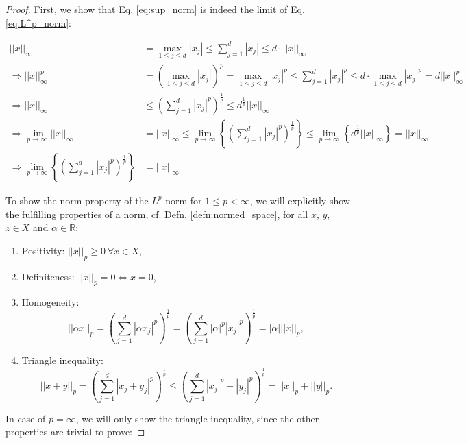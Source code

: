 \documentclass[12pt, a4paper]{article}
\numberwithin{equation}{section}
\theoremstyle{definition}
\theoremstyle{definition}
\newcommand{\norm}[2]{\left\vert\left\vert #1 \right\vert\right\vert_{#2}}
\newcommand{\abs}[1]{\left\vert #1 \right\vert}
\begin{document}
	\begin{proof}
		First, we show that Eq. \eqref{eq:sup_norm} is indeed the limit of Eq. \eqref{eq:L^p_norm}:
	
		\begin{align}
			\norm{x}{\infty} &= \max_{1\leq j\leq d}{\abs{x_j}} \leq \sum_{j=1}^{d}\abs{x_j} \leq d \cdot \norm{x}{\infty}
			\\ \Rightarrow \norm{x}{\infty}^p &= \left(\max_{1\leq j\leq d}{\abs{x_j}}\right)^p = \max_{1\leq j\leq d}{\abs{x_j}^p} \leq \sum_{j=1}^{d}\abs{x_j}^p \leq d \cdot \max_{1\leq j\leq d}{\abs{x_j}^p} = d\norm{x}{\infty}^p
			\\ \Rightarrow \norm{x}{\infty} &\leq \left(\sum_{j=1}^{d}\abs{x_j}^p\right)^{\frac{1}{p}} \leq d^{\frac{1}{p}}\norm{x}{\infty}
			\\ \Rightarrow \lim\limits_{p\to\infty}\norm{x}{\infty} &= \norm{x}{\infty} \leq \lim\limits_{p\to\infty}\left\{\left(\sum_{j=1}^{d}\abs{x_j}^p\right)^{\frac{1}{p}}\right\} \leq \lim\limits_{p\to\infty}\left\{d^{\frac{1}{p}}\norm{x}{\infty}\right\} = \norm{x}{\infty}
			\\ \Rightarrow \lim\limits_{p\to\infty}\left\{\left(\sum_{j=1}^{d}\abs{x_j}^p\right)^{\frac{1}{p}}\right\} &= \norm{x}{\infty}
		\end{align}
	
		To show the norm property of the $L^p$ norm for $1 \leq p < \infty$, we will explicitly show the fulfilling properties of a norm, cf. Defn. \eqref{defn:normed_space}, for all $x$, $y$, $z\in X$ and $\alpha\in \mathbb{R}$:
	
		\begin{enumerate}
			\item Positivity: $\norm{x}{p} \geq 0 \ \forall x\in X$,
			\item Definiteness: $\norm{x}{p} = 0\Leftrightarrow x = 0$,
			\item Homogeneity: $$\norm{\alpha x}{p} = \left(\sum_{j=1}^{d}\abs{\alpha x_j}^p\right)^{\frac{1}{p}} = \left(\sum_{j=1}^{d}\abs{\alpha}^p\abs{x_j}^p\right)^{\frac{1}{p}} = \abs{\alpha}\norm{x}{p},$$
			\item Triangle inequality: $$\norm{x + y}{p} = \left(\sum_{j=1}^{d}\abs{x_j + y_j}^p\right)^{\frac{1}{p}} \leq \left(\sum_{j=1}^{d}\abs{x_j}^p + \abs{y_j}^p\right)^{\frac{1}{p}} = \norm{x}{p} + \norm{y}{p}.$$	
		\end{enumerate}
		
		In case of $p = \infty$, we will only show the triangle inequality, since the other properties are trivial to prove:
		

\end{proof}
\end{document}
